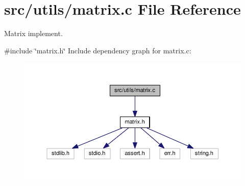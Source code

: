 \section{src/utils/matrix.c File Reference}
\label{matrix_8c}


Matrix implement.  


{\ttfamily \#include \char`\"{}matrix.\+h\char`\"{}}\newline
Include dependency graph for matrix.\+c\+:
\nopagebreak
\begin{figure}[H]
\begin{center}
\leavevmode
\includegraphics[width=350pt]{matrix_8c__incl}
\end{center}
\end{figure}
